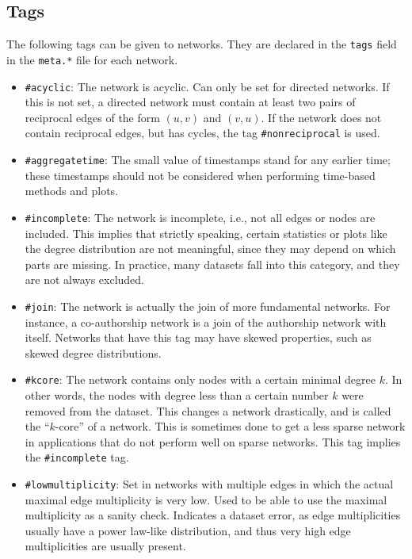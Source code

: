 \documentclass{article}
\begin{document}
\subsection{Tags}
\label{sec:tags}
The following tags can be given to networks.  They are declared in the
\texttt{tags} field in the \texttt{meta.*} file for each network. 
\begin{itemize}
\item \texttt{\#acyclic}:  The network is acyclic.  Can only be
  set for directed networks.  If this is not set, a directed
  network must contain at least two pairs of reciprocal edges of
  the form $(u,v)$ and $(v,u)$.  If the network does not contain
  reciprocal edges, but has cycles, the tag
  \texttt{\#nonreciprocal} is used.
\item \texttt{\#aggregatetime}:  The small value of timestamps
  stand for any earlier time; these timestamps should not be
  considered when performing time-based methods and plots. 
\item \texttt{\#incomplete}: The network is incomplete, i.e.,
  not all edges or nodes are included.  This implies that
  strictly speaking, certain statistics or plots like 
  the degree distribution are not meaningful, since they may
  depend on which parts are missing.  In practice, many datasets
  fall into this category, and they are not always excluded. 
\item \texttt{\#join}:  The network is actually the join of more
  fundamental networks.  For instance, a co-authorship network
  is a join of the authorship network with itself.  Networks
  that have this tag may have skewed properties, such as skewed
  degree distributions.
\item \texttt{\#kcore}: The network contains only nodes with a
  certain minimal degree $k$. In other words, the nodes with
  degree less than a certain number $k$ were removed from the
  dataset.  This changes a network drastically, and is called
  the ``$k$-core'' of a network. This is sometimes done to get
  a less sparse network in applications that do not perform well
  on sparse networks. This tag implies the
  \texttt{\#incomplete} tag.
\item \texttt{\#lowmultiplicity}:  Set in networks with multiple
  edges in which the actual maximal edge multiplicity is very
  low.  Used to be able to use the maximal multiplicity as a
  sanity check.  Indicates a dataset error, as edge
  multiplicities usually have a power law-like distribution, and
  thus very high edge multiplicities are usually present. 

\end{itemize}
\end{document}
